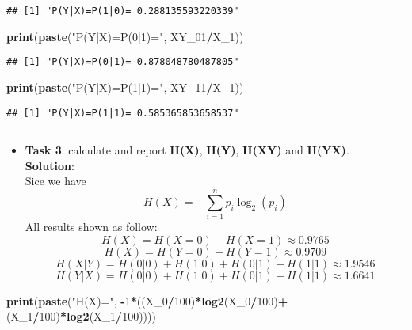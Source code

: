 \documentclass[]{article}
\newenvironment{Shaded}{\begin{snugshade}}{\end{snugshade}}
\newcommand{\KeywordTok}[1]{\textcolor[rgb]{0.13,0.29,0.53}{\textbf{#1}}}
\newcommand{\DecValTok}[1]{\textcolor[rgb]{0.00,0.00,0.81}{#1}}
\newcommand{\StringTok}[1]{\textcolor[rgb]{0.31,0.60,0.02}{#1}}
\newcommand{\OperatorTok}[1]{\textcolor[rgb]{0.81,0.36,0.00}{\textbf{#1}}}
\newcommand{\NormalTok}[1]{#1}
\providecommand{\tightlist}{%
  \setlength{\itemsep}{0pt}\setlength{\parskip}{0pt}}
\begin{document}
\begin{verbatim}
## [1] "P(Y|X)=P(1|0)= 0.288135593220339"
\end{verbatim}

\begin{Shaded}
\begin{Highlighting}[]
\KeywordTok{print}\NormalTok{(}\KeywordTok{paste}\NormalTok{(}\StringTok{"P(Y|X)=P(0|1)="}\NormalTok{, XY_}\DecValTok{01}\OperatorTok{/}\NormalTok{X_}\DecValTok{1}\NormalTok{))}
\end{Highlighting}
\end{Shaded}

\begin{verbatim}
## [1] "P(Y|X)=P(0|1)= 0.878048780487805"
\end{verbatim}

\begin{Shaded}
\begin{Highlighting}[]
\KeywordTok{print}\NormalTok{(}\KeywordTok{paste}\NormalTok{(}\StringTok{"P(Y|X)=P(1|1)="}\NormalTok{, XY_}\DecValTok{11}\OperatorTok{/}\NormalTok{X_}\DecValTok{1}\NormalTok{))}
\end{Highlighting}
\end{Shaded}

\begin{verbatim}
## [1] "P(Y|X)=P(1|1)= 0.585365853658537"
\end{verbatim}

\begin{center}\rule{0.5\linewidth}{\linethickness}\end{center}

\begin{itemize}
\tightlist
\item
  \textbf{Task 3}. calculate and report \textbf{H(X)}, \textbf{H(Y)},
  \textbf{H(X\textbar{}Y)} and \textbf{H(Y\textbar{}X)}.\\
  \textbf{Solution}:\\
  Sice we have
  \[H(X)=-\sum _{ i=1 }^{ n }{ p_{ i }\log _{ 2 }{ ({ p }_{ i }) }  } \]
  All results shown as follow: \[ H(X)=H(X=0)+H(X=1)\approx0.9765\]
  \[ H(X)=H(Y=0)+H(Y=1)\approx0.9709\]
  \[ H(X|Y)=H(0|0)+H(1|0)+H(0|1)+H(1|1)\approx1.9546\]
  \[H(Y|X)=H(0|0)+H(1|0)+H(0|1)+H(1|1)\approx1.6641\]
\end{itemize}

\begin{Shaded}
\begin{Highlighting}[]
\KeywordTok{print}\NormalTok{(}\KeywordTok{paste}\NormalTok{(}\StringTok{"H(X)="}\NormalTok{, }\OperatorTok{-}\DecValTok{1}\OperatorTok{*}\NormalTok{((X_}\DecValTok{0}\OperatorTok{/}\DecValTok{100}\NormalTok{)}\OperatorTok{*}\KeywordTok{log2}\NormalTok{(X_}\DecValTok{0}\OperatorTok{/}\DecValTok{100}\NormalTok{)}\OperatorTok{+}\NormalTok{(X_}\DecValTok{1}\OperatorTok{/}\DecValTok{100}\NormalTok{)}\OperatorTok{*}\KeywordTok{log2}\NormalTok{(X_}\DecValTok{1}\OperatorTok{/}\DecValTok{100}\NormalTok{))))}
\end{Highlighting}
\end{Shaded}
\end{document}
